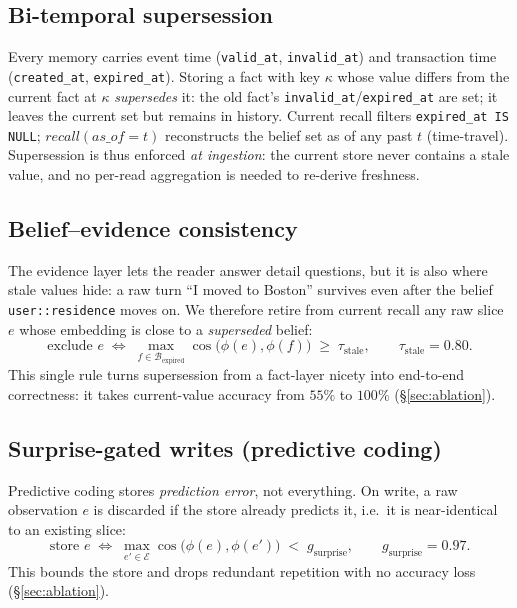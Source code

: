 \documentclass[11pt]{article}
\begin{document}
\subsection{Bi-temporal supersession}
Every memory carries event time (\texttt{valid\_at}, \texttt{invalid\_at}) and transaction
time (\texttt{created\_at}, \texttt{expired\_at}). Storing a fact with key $\kappa$ whose
value differs from the current fact at $\kappa$ \emph{supersedes} it: the old fact's
\texttt{invalid\_at}/\texttt{expired\_at} are set; it leaves the current set but remains
in history. Current recall filters \texttt{expired\_at IS NULL};
$\textit{recall}(\textit{as\_of}=t)$ reconstructs the belief set as of any past $t$
(time-travel). Supersession is thus enforced \emph{at ingestion}: the current store never
contains a stale value, and no per-read aggregation is needed to re-derive freshness.

\subsection{Belief--evidence consistency}\label{sec:bec}
The evidence layer lets the reader answer detail questions, but it is also where stale
values hide: a raw turn ``I moved to Boston'' survives even after the belief
\texttt{user::residence} moves on. We therefore retire from current recall any raw slice
$e$ whose embedding is close to a \emph{superseded} belief:
\begin{equation}
\text{exclude } e \;\Leftrightarrow\; \max_{f\in\mathcal{B}_{\text{expired}}}
\cos\!\big(\phi(e),\phi(f)\big) \;\ge\; \tau_{\text{stale}}, \qquad
\tau_{\text{stale}}=0.80 .
\end{equation}
This single rule turns supersession from a fact-layer nicety into end-to-end correctness:
it takes current-value accuracy from $55\%$ to $100\%$ (\S\ref{sec:ablation}).

\subsection{Surprise-gated writes (predictive coding)}
Predictive coding stores \emph{prediction error}, not everything. On write, a raw observation
$e$ is discarded if the store already predicts it, i.e.\ it is near-identical to an
existing slice:
\begin{equation}
\text{store } e \;\Leftrightarrow\; \max_{e'\in\mathcal{E}}
\cos\!\big(\phi(e),\phi(e')\big) \;<\; g_{\text{surprise}}, \qquad
g_{\text{surprise}}=0.97 .
\end{equation}
This bounds the store and drops redundant repetition with no accuracy loss
(\S\ref{sec:ablation}).
\end{document}
